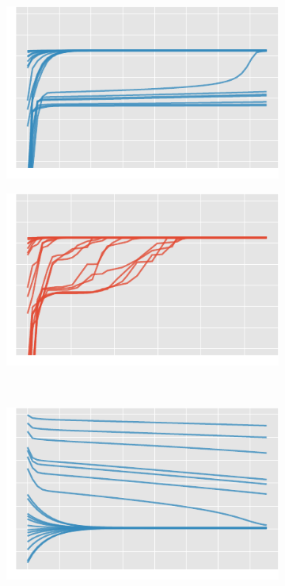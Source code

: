  \begin{figure}[htb]%
    \centering%
    \begin{subfigure}[t]{0.5\textwidth}%
    	\centering%
    	\includegraphics[width=\textwidth]{img/ballistic_lh_em}%
    \end{subfigure}%
    \begin{subfigure}[t]{0.5\textwidth}%
    	\centering%
		\includegraphics[width=\textwidth]{img/ballistic_lh_bf}%
    \end{subfigure}\\%
    \begin{subfigure}[t]{0.5\textwidth}%
    	\centering%
    	\includegraphics[width=\textwidth]{img/ballistic_em_uy}%

\end{subfigure}
\end{figure}
